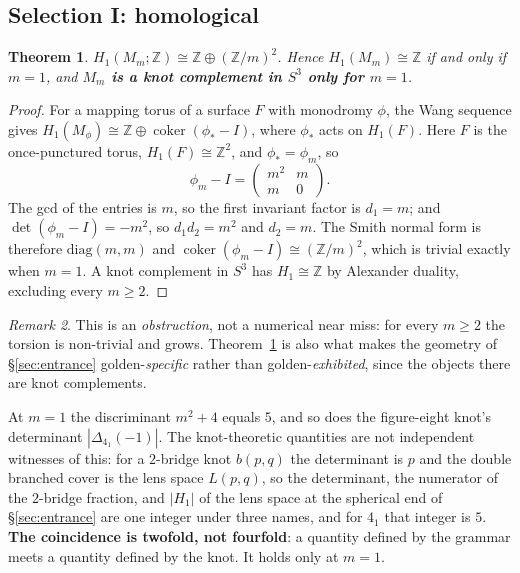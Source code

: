 \documentclass[11pt,reqno]{amsart}
\theoremstyle{plain}
\newtheorem{theorem}{Theorem}[section]
\theoremstyle{definition}
\theoremstyle{remark}
\newtheorem{remark}[theorem]{Remark}
\newcommand{\Z}{\mathbb{Z}}
\newcommand{\coker}{\operatorname{coker}}
\begin{document}
\subsection{Selection I: homological}\label{sec:homological}

\begin{theorem}\label{thm:homology}
$H_1(M_m;\Z)\cong\Z\oplus(\Z/m)^2$. Hence $H_1(M_m)\cong\Z$ if and only if $m=1$, and
\textbf{$M_m$ is a knot complement in $S^3$ only for $m=1$}.
\end{theorem}

\begin{proof}
For a mapping torus of a surface $F$ with monodromy $\phi$, the Wang sequence gives
$H_1(M_\phi)\cong\Z\oplus\coker(\phi_*-I)$, where $\phi_*$ acts on $H_1(F)$. Here $F$ is
the once-punctured torus, $H_1(F)\cong\Z^2$, and $\phi_*=\phi_m$, so
\[
   \phi_m-I=\begin{pmatrix}m^2&m\\m&0\end{pmatrix}.
\]
The gcd of the entries is $m$, so the first invariant factor is $d_1=m$; and
$\det(\phi_m-I)=-m^2$, so $d_1d_2=m^2$ and $d_2=m$. The Smith normal form is therefore
$\mathrm{diag}(m,m)$ and $\coker(\phi_m-I)\cong(\Z/m)^2$, which is trivial exactly when
$m=1$. A knot complement in $S^3$ has $H_1\cong\Z$ by Alexander duality, excluding every
$m\ge2$.
\end{proof}

\begin{remark}
This is an \emph{obstruction}, not a numerical near miss: for every $m\ge2$ the torsion
is non-trivial and grows. Theorem~\ref{thm:homology} is also what makes the geometry of
\S\ref{sec:entrance} golden-\emph{specific} rather than golden-\emph{exhibited}, since
the objects there are knot complements.
\end{remark}

At $m=1$ the discriminant $m^2+4$ equals $5$, and so does the figure-eight knot's
determinant $|\Delta_{4_1}(-1)|$. The knot-theoretic quantities are not independent
witnesses of this: for a $2$-bridge knot $b(p,q)$ the determinant is $p$ and the double
branched cover is the lens space $L(p,q)$, so the determinant, the numerator of the
$2$-bridge fraction, and $|H_1|$ of the lens space at the spherical end of
\S\ref{sec:entrance} are one integer under three names, and for $4_1$ that integer is
$5$. \textbf{The coincidence is twofold, not fourfold}: a quantity defined by the
grammar meets a quantity defined by the knot. It holds only at $m=1$.
\end{document}
